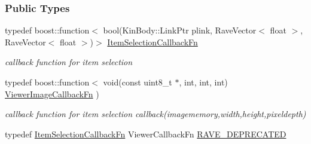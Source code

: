 \subsubsection*{Public Types}
\begin{DoxyCompactItemize}
\item 
typedef boost::function$<$ bool(KinBody::LinkPtr plink, RaveVector$<$ float $>$, RaveVector$<$ float $>$)$>$ \hyperlink{classOpenRAVE_1_1ViewerBase_aab6d9553843a6d593ee530045d7fff9f}{ItemSelectionCallbackFn}
\begin{DoxyCompactList}\small\item\em callback function for item selection \item\end{DoxyCompactList}\item 
typedef boost::function$<$ void(const uint8\_\-t $\ast$, int, int, int) \hyperlink{classOpenRAVE_1_1ViewerBase_a33dae9848e343e6740ad259e09e92607}{ViewerImageCallbackFn} )
\begin{DoxyCompactList}\small\item\em callback function for item selection callback(imagememory,width,height,pixeldepth) \item\end{DoxyCompactList}\item 
typedef \hyperlink{classOpenRAVE_1_1ViewerBase_aab6d9553843a6d593ee530045d7fff9f}{ItemSelectionCallbackFn} ViewerCallbackFn \hyperlink{classOpenRAVE_1_1ViewerBase_ab0582044ee7b7222de5e7406ad64f93a}{RAVE\_\-DEPRECATED}
\end{DoxyCompactItemize}
